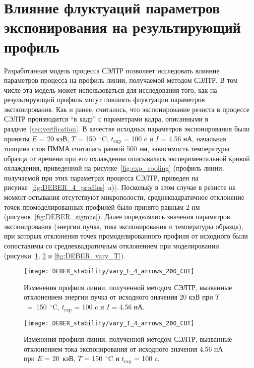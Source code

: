\section{Влияние флуктуаций параметров экспонирования на результирующий профиль}

Разработанная модель процесса СЭЛТР позволяет исследовать влияние параметров процесса на профиль линии, получаемой методом СЭЛТР. В том числе эта модель может использоваться для исследования того, как на результирующий профиль могут повлиять флуктуации параметров экспонирования. Как и ранее, считалось, что экспонирование резиста в процессе СЭЛТР производится \linebreak ``в кадр'' с параметрами кадра, описанными в разделе~\ref{sec:verification}. В качестве исходных параметров экспонирования были приняты $E$ = 20 кэВ, $T$ = 150~$^\circ$C, $t_\mathrm{exp}$ = 100 c и \linebreak $I$ = 4.56 нА, начальная толщина слоя ПММА считалась равной 500 нм, зависимость температуры образца от времени при его охлаждении описывалась экспериментальной кривой охлаждения, приведенной на рисунке~\ref{fig:exp_cooling} (профиль линии, получаемой при этих параметрах процесса СЭЛТР, приведен на рисунке~\ref{fig:DEBER_4_profiles}~a)). Поскольку в этом случае в резисте на момент остывания отсутствуют микрополости, среднеквадратичное отклонение точек промоделированных профилей было принято равным 2 нм (рисунок~\ref{fig:DEBER_sigmas}). Далее определялись значения параметров экспонирования (энергии пучка, тока экспонирования и температуры образца), при которых отклонения точек промоделированного профиля от исходного были сопоставимы со среднеквадратичным отклонением при моделировании (рисунки~\ref{fig:DEBER_vary_E}, \ref{fig:DEBER_vary_I} и \ref{fig:DEBER_vary_T}).

\begin{figure}[h!]
	\begin{center}
		\texttt{[image: DEBER\_stability/vary\_E\_4\_arrows\_200\_CUT]}
	\end{center}
	\caption{Изменения профиля линии, полученной методом СЭЛТР, вызванные отклонением энергии пучка от исходного значения 20 кэВ при $T$~=~150~$^\circ$C, $t_\mathrm{exp}$ = 100 c и $I$ = 4.56 нА.}
	\label{fig:DEBER_vary_E}
\end{figure}

\begin{figure}[h!]
	\begin{center}
		\texttt{[image: DEBER\_stability/vary\_I\_4\_arrows\_200\_CUT]}
	\end{center}
	\caption{Изменения профиля линии, полученной методом СЭЛТР, вызванные отклонением тока экспонирования от исходного значения 4.56 нА при $E$ = 20~кэВ, $T$ = 150~$^\circ$C и $t_\mathrm{exp}$ = 100 c.}
	\label{fig:DEBER_vary_I}
\end{figure}

